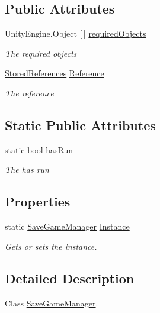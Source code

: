 \subsection*{Public Attributes}
\begin{DoxyCompactItemize}
\item 
Unity\+Engine.\+Object \mbox{[}$\,$\mbox{]} \hyperlink{class_save_game_manager_ac283b8025430fb42da7de00348802d10}{required\+Objects}
\begin{DoxyCompactList}\small\item\em The required objects \end{DoxyCompactList}\item 
\hyperlink{class_stored_references}{Stored\+References} \hyperlink{class_save_game_manager_acc8730127bdf53e84b735585679ddb95}{Reference}
\begin{DoxyCompactList}\small\item\em The reference \end{DoxyCompactList}\end{DoxyCompactItemize}
\subsection*{Static Public Attributes}
\begin{DoxyCompactItemize}
\item 
static bool \hyperlink{class_save_game_manager_a3d69dbd52700e5a5291f9a1098469c49}{has\+Run}
\begin{DoxyCompactList}\small\item\em The has run \end{DoxyCompactList}\end{DoxyCompactItemize}
\subsection*{Properties}
\begin{DoxyCompactItemize}
\item 
static \hyperlink{class_save_game_manager}{Save\+Game\+Manager} \hyperlink{class_save_game_manager_a305a46aed22f9f5d1fd473f033b90408}{Instance}
\begin{DoxyCompactList}\small\item\em Gets or sets the instance. \end{DoxyCompactList}\end{DoxyCompactItemize}


\subsection{Detailed Description}
Class \hyperlink{class_save_game_manager}{Save\+Game\+Manager}. 



